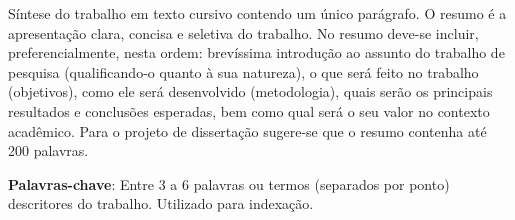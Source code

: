 %
%

\begin{resumo}

Síntese do trabalho em texto cursivo contendo um único parágrafo. O resumo é a apresentação clara, concisa e seletiva do trabalho.
No resumo deve-se incluir, preferencialmente, nesta ordem: brevíssima introdução ao assunto do trabalho de pesquisa (qualificando-o quanto à sua natureza), o que será feito no trabalho (objetivos), como ele será desenvolvido (metodologia), quais serão os principais resultados e conclusões esperadas, bem como qual será o seu valor no contexto acadêmico. Para o projeto de dissertação sugere-se que o resumo contenha até 200 palavras.

\textbf{Palavras-chave}: Entre 3 a 6 palavras ou termos (separados por ponto) descritores do trabalho. Utilizado para indexação.

\end{resumo}
